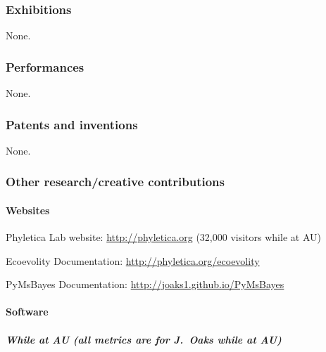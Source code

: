 

\subsubsection{Exhibitions}
None.

\subsubsection{Performances}
None.

\subsubsection{Patents and inventions}
None.

\subsubsection{Other research/creative contributions}
 
\paragraph{Websites}
\begin{tightItemize}
    \item Phyletica Lab website: \url{http://phyletica.org} (32,000 visitors while at AU)
    \item Ecoevolity Documentation: \url{http://phyletica.org/ecoevolity}
    \item PyMsBayes Documentation: \url{http://joaks1.github.io/PyMsBayes}
\end{tightItemize}

\paragraph{Software}
\subparagraph*{While at AU (all metrics are for J.\ Oaks while at AU)}



